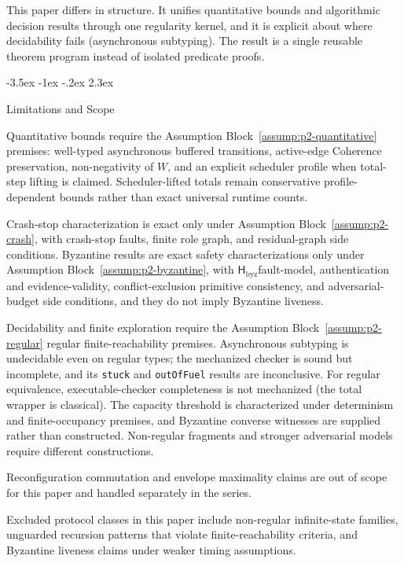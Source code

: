 \documentclass[a4paper,10pt,twocolumn,english]{article}
\makeatletter
\renewcommand{\section}{\@startsection{section}{1}{\z@}%
  {-3.5ex \@plus -1ex \@minus -.2ex}%
  {2.3ex}%
  {\raggedright\normalfont\large\bfseries}}
\numberwithin{equation}{section}
\theoremstyle{paperdef}
\theoremstyle{paperplain}
\theoremstyle{paperdef}
\theoremstyle{paperremark}
\newcommand{\Hbyz}{\ensuremath{\mathsf{H}_{\mathrm{byz}}}}
\makeatother
\begin{document}
This paper differs in structure. It unifies quantitative bounds and algorithmic decision results through one regularity kernel, and it is explicit about where decidability fails (asynchronous subtyping). The result is a single reusable theorem program instead of isolated predicate proofs.

\section{Limitations and Scope}
\label{sec:limitations}

Quantitative bounds require the Assumption Block~\ref{assump:p2-quantitative} premises: well-typed asynchronous buffered transitions, active-edge Coherence preservation, non-negativity of $W$, and an explicit scheduler profile when total-step lifting is claimed. Scheduler-lifted totals remain conservative profile-dependent bounds rather than exact universal runtime counts.

Crash-stop characterization is exact only under Assumption Block~\ref{assump:p2-crash}, with crash-stop faults, finite role graph, and residual-graph side conditions. Byzantine results are exact safety characterizations only under Assumption Block~\ref{assump:p2-byzantine}, with \Hbyz fault-model, authentication and evidence-validity, conflict-exclusion primitive consistency, and adversarial-budget side conditions, and they do not imply Byzantine liveness.

Decidability and finite exploration require the Assumption Block~\ref{assump:p2-regular} regular finite-reachability premises. Asynchronous subtyping is undecidable even on regular types; the mechanized checker is sound but incomplete, and its \texttt{stuck} and \texttt{outOfFuel} results are inconclusive. For regular equivalence, executable-checker completeness is not mechanized (the total wrapper is classical). The capacity threshold is characterized under determinism and finite-occupancy premises, and Byzantine converse witnesses are supplied rather than constructed. Non-regular fragments and stronger adversarial models require different constructions.

Reconfiguration commutation and envelope maximality claims are out of scope for this paper and handled separately in the series.

Excluded protocol classes in this paper include non-regular infinite-state
families, unguarded recursion patterns that violate finite-reachability
criteria, and Byzantine liveness claims under weaker timing assumptions.
\end{document}

